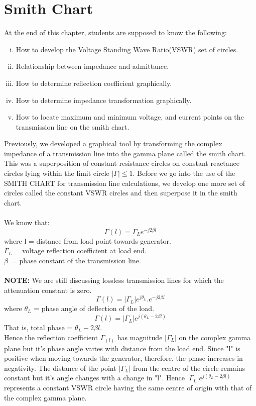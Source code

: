 \chapter{Smith Chart}
At the end of this chapter, students are supposed to know the following:

\begin{enumerate}[(i)]
\item How to develop the Voltage Standing Wave Ratio(VSWR) set of circles.
\item Relationship between impedance and admittance.
\item How to determine reflection coefficient graphically.
\item How to determine impedance transformation graphically.
\item How to locate maximum and minimum voltage, and current points on the transmission line on the smith chart.
\end{enumerate}
Previously, we developed a graphical tool by transforming the complex impedance of a transmission line into the gamma plane called the smith chart. This was a superposition of constant resistance circles on constant reactance circles lying within the limit circle $|\Gamma| \leq 1$. Before we go into the use of the SMITH CHART for transmission line calculations, we develop one more set of circles called the constant VSWR circles and then superpose it in the smith chart.\\\\ We know that:
\begin{equation*}
\Gamma(l) =\Gamma_L e^{-j2\beta{l}}
\end{equation*}
where l = distance from load point towards generator.\\
$\Gamma_{L}$ = voltage reflection coefficient at load end.\\ 	
$\beta$\ = phase constant of the transmission line.\\\\
\textbf{NOTE:}	We are still discussing lossless transmission lines for which the attenuation constant is zero.
\begin{equation*}
\Gamma{(l)}=|\Gamma_{L}|e^{j\theta_L}.e^{-j2\beta l}
\end{equation*}
where	$\theta_L$ = phase angle of deflection of the load.
\begin{equation}
\Gamma{(l)} =|\Gamma_L|e^{j(\theta_L - 2\beta{l})}
\end{equation}
That is, total phase = $\theta_L - 2\beta{l}$.\\
Hence the reflection coefficient $\Gamma_{(l)}$ has magnitude $|\Gamma_L|$ on the complex gamma plane but it's phase angle varies with distance from the load end. Since "l" is positive when moving towards the generator, therefore, the phase increases in negativity. The distance of the point $|\Gamma_L|$ from the centre of the circle remains constant but it's angle changes with a change in "l". Hence $|\Gamma_L|e^{j(\theta_L - 2\beta l)}$ represents a constant VSWR circle having the same centre of origin with that of the complex gamma plane.

